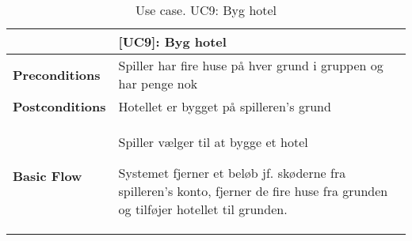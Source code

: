 \documentclass[class=article, crop=false]{standalone}
\begin{document}
    \begin{table}[H]
        \caption{Use case. UC9: Byg hotel}
        \begin{tabularx}{\textwidth}{|l|X|}
            \hline
            & \textbf{[UC9]: Byg hotel}   \\ \hline
            \textbf{Preconditions}       & Spiller har fire huse på hver grund i gruppen og har penge nok\\ \hline
            \textbf{Postconditions}      & Hotellet er bygget på spilleren's grund\\ \hline


            \textbf{Basic Flow} & \begin{tabenum}
                                      \item Spiller vælger til at bygge et hotel
                                      \item Systemet fjerner et beløb jf. skøderne fra spilleren's konto, fjerner de fire huse fra grunden og tilføjer hotellet til grunden.
            \end{tabenum}   \\ \hline



        \end{tabularx}


    \end{table}
\end{document}
